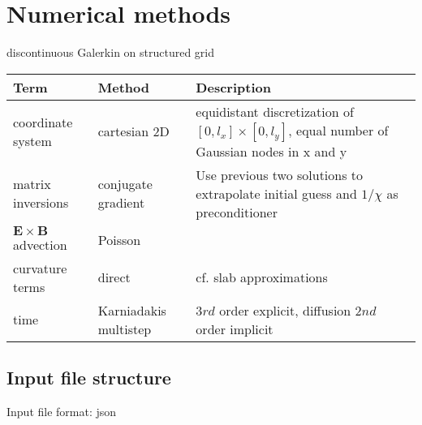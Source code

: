 \documentclass{hitec} %
\newcommand{\ExB}{$\bm{E}\times\bm{B} \,$}
\begin{document}
\section{Numerical methods}
discontinuous Galerkin on structured grid 
\begin{longtable}{ll>{\RaggedRight}p{7cm}}
\toprule
\rowcolor{gray!50}\textbf{Term} &  \textbf{Method} & \textbf{Description}  \\ \midrule
coordinate system & cartesian 2D & equidistant discretization of $[0,l_x] \times [0,l_y]$, equal number of Gaussian nodes in x and y \\
matrix inversions & conjugate gradient & Use previous two solutions to extrapolate initial guess and $1/\chi$ as preconditioner \\
\ExB advection & Poisson & \\
curvature terms & direct & cf. slab approximations \\
time &  Karniadakis multistep & $3rd$ order explicit, diffusion $2nd$ order implicit \\
\bottomrule
\end{longtable}
\subsection{Input file structure}
Input file format: json
\end{document}
